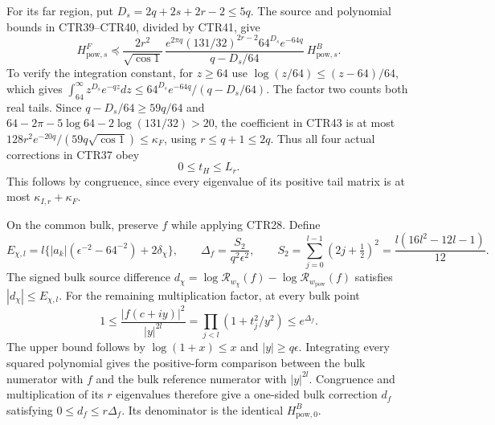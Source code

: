 For its far region, put $D_s=2q+2s+2r-2\leq5q$.
The source and polynomial bounds in CTR39--CTR40, divided by CTR41,
give
\[
 H_{\mathrm{pow},s}^F\preceq
 \frac{2r^2}{\sqrt{\cos1}}\,
 \frac{e^{2\pi q}(131/32)^{2r-2}64^{D_s}e^{-64q}}
      {q-D_s/64}\ H_{\mathrm{pow},s}^B.
 \tag{CTR43}
\]
To verify the integration constant, for $z\geq64$ use
$\log(z/64)\leq(z-64)/64$, which gives
$\int_{64}^\infty z^{D_s}e^{-qz}dz
\leq64^{D_s}e^{-64q}/(q-D_s/64)$.
The factor two counts both real tails. Since
$q-D_s/64\geq59q/64$ and
$64-2\pi-5\log64-2\log(131/32)>20$, the coefficient in CTR43 is
at most
$128r^2e^{-20q}/(59q\sqrt{\cos1})\leq\kappa_F$,
using $r\leq q+1\leq2q$.
Thus all four actual corrections in CTR37 obey
\[
 0\leq t_H\leq L_r.
 \tag{CTR44}
\]
This follows by congruence, since every eigenvalue of its positive
tail matrix is at most $\kappa_{I,r}+\kappa_F$.

On the common bulk, preserve $f$ while applying CTR28. Define
\[
 E_{\chi,l}
   =l\{|a_k|(\epsilon^{-2}-64^{-2})+2\delta_\chi\},\qquad
 \Delta_f=\frac{S_2}{q^2\epsilon^2},\qquad
 S_2=\sum_{j=0}^{l-1}(2j+\tfrac12)^2
     =\frac{l(16l^2-12l-1)}{12}.
 \tag{CTR45}
\]
The signed bulk source difference
$d_\chi=\log\mathcal R_{w_\chi}(f)
       -\log\mathcal R_{w_{\mathrm{pow}}}(f)$ satisfies
$|d_\chi|\leq E_{\chi,l}$.
For the remaining multiplication factor, at every bulk point
\[
 1\leq\frac{|f(c+iy)|^2}{|y|^{2l}}
       =\prod_{j<l}(1+t_j^2/y^2)\leq e^{\Delta_f}.
 \tag{CTR46}
\]
The upper bound follows by $\log(1+x)\leq x$ and $|y|\geq q\epsilon$.
Integrating every squared polynomial gives the positive-form comparison
between the bulk numerator with $f$ and the bulk reference numerator
with $|y|^{2l}$. Congruence and multiplication of its $r$ eigenvalues
therefore give a one-sided bulk correction $d_f$ satisfying
$0\leq d_f\leq r\Delta_f$. Its denominator is the identical
$H_{\mathrm{pow},0}^B$.

